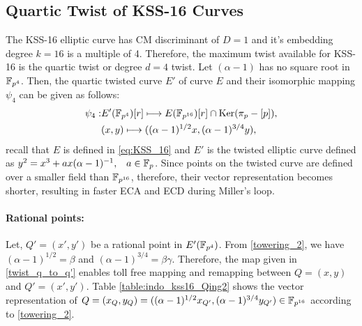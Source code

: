 \subsection{Quartic Twist of KSS-16 Curves}
 \label{eq:quartic_twist_cvma_kss16}
The KSS-16 elliptic curve has CM discriminant of $D = 1$ and it's embedding degree $k=16$ is a multiple of 4. 
Therefore, the maximum twist available for KSS-16 is the quartic twist or degree $d=4$ twist.
Let $(\alpha-1)$ has no square root in $\mathbb{F}_{p^4}$.  
Then, the quartic twisted curve $E'$ of curve $E$  and their isomorphic mapping $\psi_4$ can be given as follows:
\begin{align}
\psi_4: & E'(\mathbb{F}_{p^4})[r] \longmapsto E(\mathbb{F}_{p^{16}})[r]\cap {\rm Ker}(\pi_p-[p]),\nonumber\\
& (x,y)\longmapsto  ((\alpha-1)^{1/2}x,(\alpha-1)^{3/4}y),\label{twist_q_to_q'}
\end{align}
recall that $E$ is defined in \eqref{eq:KSS_16} and $E'$ is the twisted elliptic curve defined as $y^2=  x^3+ax(\alpha-1)^{-1},\;\;\;a\in{\mathbb{F}}_{p}$.
Since points on the twisted curve are defined over a smaller field than $\mathbb{F}_{p^{16}}$, therefore, their vector representation becomes shorter, resulting in faster ECA and ECD during Miller's loop. 
\paragraph{\bf{Rational points: }} 
Let, $Q'=(x',y')$ be a rational point in $E'(\mathbb{F}_{p^4})$. 
From \eqref{towering_2}, we have  $(\alpha-1)^{1/2}=\beta$ and $(\alpha-1)^{3/4}=\beta\gamma$.
Therefore, the map given in  \eqref{twist_q_to_q'} enables toll free mapping and remapping between $Q=(x,y)$ and $Q'=(x',y')$.
Table \ref{table:indo_kss16_Qing2} shows the vector representation of $Q = (x_{Q},y_Q) = ((\alpha-1)^{1/2}x_{Q'},(\alpha-1)^{3/4}y_{Q'}) \in \mathbb{F}_{p^{16}}$ according to \eqref{towering_2}. 

